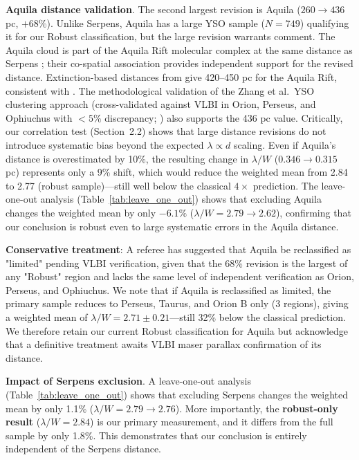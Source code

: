 \documentclass[twoside,twocolumn]{mnras}
\begin{document}
\textbf{Aquila distance validation}. The second largest revision is Aquila ($260 \to 436$ pc, $+68\%$). Unlike Serpens, Aquila has a large YSO sample ($N = 749$) qualifying it for our Robust classification, but the large revision warrants comment. The Aquila cloud is part of the Aquila Rift molecular complex at the same distance as Serpens \citep[both $\sim$430--460 pc;][]{Zucker2020}; their co-spatial association provides independent support for the revised distance. Extinction-based distances from \citet{Green2024} give 420--450 pc for the Aquila Rift, consistent with \citet{Zhang2023}. The methodological validation of the Zhang et al.\ YSO clustering approach (cross-validated against VLBI in Orion, Perseus, and Ophiuchus with $<5\%$ discrepancy; \citealt{Zhang2023}) also supports the 436 pc value. Critically, our correlation test (Section~2.2) shows that large distance revisions do not introduce systematic bias beyond the expected $\lambda \propto d$ scaling. Even if Aquila's distance is overestimated by 10\%, the resulting change in $\lambda/W$ ($0.346 \to 0.315$ pc) represents only a 9\% shift, which would reduce the weighted mean from 2.84 to 2.77 (robust sample)---still well below the classical $4\times$ prediction. The leave-one-out analysis (Table~\ref{tab:leave_one_out}) shows that excluding Aquila changes the weighted mean by only $-6.1\%$ ($\lambda/W = 2.79 \to 2.62$), confirming that our conclusion is robust even to large systematic errors in the Aquila distance.

\textbf{Conservative treatment}: A referee has suggested that Aquila be reclassified as "limited" pending VLBI verification, given that the 68\% revision is the largest of any "Robust" region and lacks the same level of independent verification as Orion, Perseus, and Ophiuchus. We note that if Aquila is reclassified as limited, the primary sample reduces to Perseus, Taurus, and Orion B only (3 regions), giving a weighted mean of $\lambda/W = 2.71 \pm 0.21$---still 32\% below the classical prediction. We therefore retain our current Robust classification for Aquila but acknowledge that a definitive treatment awaits VLBI maser parallax confirmation of its distance.

\textbf{Impact of Serpens exclusion}. A leave-one-out analysis (Table~\ref{tab:leave_one_out}) shows that excluding Serpens changes the weighted mean by only 1.1\% ($\lambda/W = 2.79 \to 2.76$). More importantly, the \textbf{robust-only result} ($\lambda/W = 2.84$) is our primary measurement, and it differs from the full sample by only 1.8\%. This demonstrates that our conclusion is entirely independent of the Serpens distance.
\end{document}
